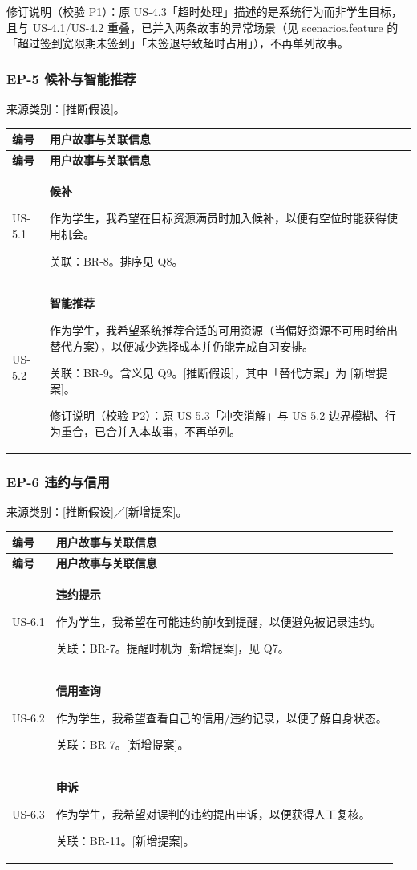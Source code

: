 \documentclass[11pt,a4paper]{article}
\begin{document}
\noindent 修订说明（校验 P1）：原 US-4.3「超时处理」描述的是系统行为而非学生目标，且与 US-4.1/US-4.2 重叠，已并入两条故事的异常场景（见 scenarios.feature 的「超过签到宽限期未签到」「未签退导致超时占用」），不再单列故事。

\subsubsection{EP-5 候补与智能推荐}
来源类别：[推断假设]。

\begin{longtable}{@{}p{}p{}@{}}
    \toprule
    \textbf{编号} & \textbf{用户故事与关联信息} \\
    \midrule
    \endfirsthead
    \toprule
    \textbf{编号} & \textbf{用户故事与关联信息} \\
    \midrule
    \endhead
    \bottomrule
    \endlastfoot
    US-5.1 & \textbf{候补}\par 作为学生，我希望在目标资源满员时加入候补，以便有空位时能获得使用机会。\par {\small 关联：BR-8。排序见 Q8。} \\
    \midrule
    US-5.2 & \textbf{智能推荐}\par 作为学生，我希望系统推荐合适的可用资源（当偏好资源不可用时给出替代方案），以便减少选择成本并仍能完成自习安排。\par {\small 关联：BR-9。含义见 Q9。[推断假设]，其中「替代方案」为 [新增提案]。}\par {\small 修订说明（校验 P2）：原 US-5.3「冲突消解」与 US-5.2 边界模糊、行为重合，已合并入本故事，不再单列。} \\
\end{longtable}

\subsubsection{EP-6 违约与信用}
来源类别：[推断假设]／[新增提案]。

\begin{longtable}{@{}p{}p{}@{}}
    \toprule
    \textbf{编号} & \textbf{用户故事与关联信息} \\
    \midrule
    \endfirsthead
    \toprule
    \textbf{编号} & \textbf{用户故事与关联信息} \\
    \midrule
    \endhead
    \bottomrule
    \endlastfoot
    US-6.1 & \textbf{违约提示}\par 作为学生，我希望在可能违约前收到提醒，以便避免被记录违约。\par {\small 关联：BR-7。提醒时机为 [新增提案]，见 Q7。} \\
    \midrule
    US-6.2 & \textbf{信用查询}\par 作为学生，我希望查看自己的信用/违约记录，以便了解自身状态。\par {\small 关联：BR-7。[新增提案]。} \\
    \midrule
    US-6.3 & \textbf{申诉}\par 作为学生，我希望对误判的违约提出申诉，以便获得人工复核。\par {\small 关联：BR-11。[新增提案]。} \\
\end{longtable}
\end{document}
